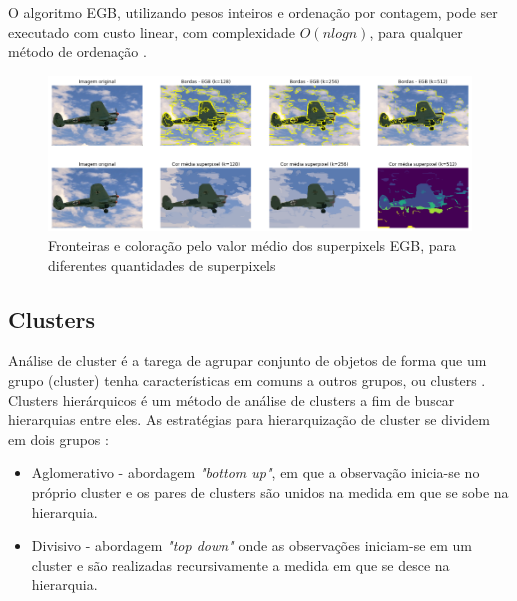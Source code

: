 \begin{document}

O algoritmo EGB, utilizando pesos inteiros e ordenação por contagem, pode ser executado com custo linear, com complexidade $O(nlogn)$, para qualquer método de ordenação \cite{FELZENSZWALB}. 

\begin{figure}[ht]
\centering
\includegraphics[width=1.\textwidth]{felz_segmentation_compare.png}
\caption{Fronteiras e coloração pelo valor médio dos superpixels EGB, para diferentes quantidades de superpixels}
\label{fig:EGB}
\end{figure}


\subsection{Clusters} \label{ssec:clusters}

Análise de cluster é a tarega de agrupar conjunto de objetos de forma que um grupo (cluster) tenha características em comuns a outros grupos, ou clusters \cite{WIKI_CLUSTER_ANALYSIS}. Clusters hierárquicos é um método de análise de clusters a fim de buscar hierarquias entre eles. As estratégias para hierarquização de cluster se dividem em dois grupos \cite{ROKACH}:

\begin{itemize}
 \item Aglomerativo - abordagem \textit{"bottom up"}, em que a observação inicia-se no próprio cluster e os pares de clusters são unidos na medida em que se sobe na hierarquia. 
 \item Divisivo - abordagem \textit{"top down"} onde as observações iniciam-se em um cluster e são realizadas recursivamente a medida em que se desce na hierarquia.
\end{itemize}
\end{document}
